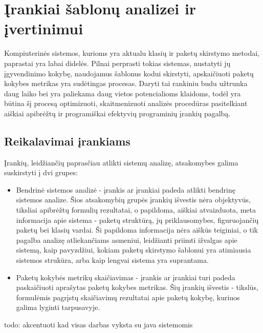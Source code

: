 \section{Įrankiai šablonų analizei ir įvertinimui}
Kompiuterinės sistemos, kurioms yra aktualu klasių ir paketų skirstymo metodai, paprastai yra labai didelės.
Pilnai perprasti tokias sistemas, nustatyti jų įgyvendinimo kokybę, naudojamus šablonus kodui skirstyti,
apskaičiuoti paketų kokybes metrikas yra sudėtingas procesas.
Daryti tai rankiniu budu užtrunka daug laiko bei yra paliekama daug vietos potencialioms klaidoms,
todėl yra būtina šį procesą optimizuoti, skaitmenizuoti analizės procedūras pasitelkiant
aiškiai apibrėžtų ir programiškai efektyvių programinių įrankių pagalbą.

\subsection{Reikalavimai įrankiams}
Įrankių, leidžiančių paprasčiau atlikti sistemų analizę, atsakomybes galima suskirstyti į dvi grupes:
\begin{itemize}
    \item Bendrinė sistemos analizė - įrankis ar įrankiai padeda atlikti bendrinę sistemos analize.
    Šios atsakomybių grupės įrankių išvestis nėra objektyvūs, tiksliai apibrėžtų formulių rezultatai, o papildoma, aiškiai
    atvaizduota, meta informacija apie sistema - paketų struktūrą, jų priklausomybes, figuruojančių paketų bei klasių vardai.
    Ši papildoma informacija nėra aiškūs teiginiai, o tik pagalba analizę atliekančiams asmeniui, leidžianti priimti ižvalgas apie sistemą,
    kaip pavyzdžiui, kokiam paketų skirstymo šablonui yra atimiausia sistemos strukūra, arba kaip lengvai sistema yra suprantama.
    \item Paketų kokybės metrikų skaičiavimas - įrankis ar įrankiai turi padeda paskaičiuoti aprašytas paketų kokybes metrikas.
    Šių įrankių išvestis - tikslūs, formulėmis pagrįstų skaičiavimų rezultatai apie paketų kokybę, kuriuos galima lyginti tarpusavyje.
\end{itemize}

todo: akcentuoti kad visas darbas vyksta su java sistemomis
